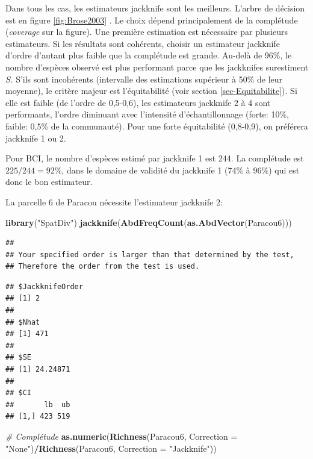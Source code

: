 \documentclass[
  11pt,
  french,
  a4paper,
  extrafontsizes,onecolumn,openright
  ]{memoir}
\newenvironment{Shaded}{\begin{snugshade}}{\end{snugshade}}
\newcommand{\CommentTok}[1]{\textcolor[rgb]{0.56,0.35,0.01}{\textit{#1}}}
\newcommand{\DataTypeTok}[1]{\textcolor[rgb]{0.13,0.29,0.53}{#1}}
\newcommand{\KeywordTok}[1]{\textcolor[rgb]{0.13,0.29,0.53}{\textbf{#1}}}
\newcommand{\NormalTok}[1]{#1}
\newcommand{\OperatorTok}[1]{\textcolor[rgb]{0.81,0.36,0.00}{\textbf{#1}}}
\newcommand{\StringTok}[1]{\textcolor[rgb]{0.31,0.60,0.02}{#1}}
\newlength{\rf}
\begin{document}
\normalsize

Dans tous les cas, les estimateurs jackknife sont les meilleurs.
L'arbre de décision est en figure \ref{fig:Brose2003} \autocite[fig.~6]{Brose2003}.
Le choix dépend principalement de la complétude (\emph{coverage} sur la figure).
Une première estimation est nécessaire par plusieurs estimateurs.
Si les résultats sont cohérents, choisir un estimateur jackknife d'ordre d'autant plus faible que la complétude est grande.
Au-delà de 96\%, le nombre d'espèces observé est plus performant parce que les jackknifes surestiment \(S\).
S'ils sont incohérents (intervalle des estimations supérieur à 50\% de leur moyenne), le critère majeur est l'équitabilité (voir section \ref{sec-Equitabilite}).
Si elle est faible (de l'ordre de 0,5-0,6), les estimateurs jackknife 2 à 4 sont performants, l'ordre diminuant avec l'intensité d'échantillonnage (forte: 10\%, faible: 0,5\% de la communauté).
Pour une forte équitabilité (0,8-0,9), on préférera jackknife 1 ou 2.

Pour BCI, le nombre d'espèces estimé par jackknife 1 est 244.
La complétude est \({225}/{244}=92\%\), dans le domaine de validité du jackknife 1 (74\% à 96\%) qui est donc le bon estimateur.

La parcelle 6 de Paracou nécessite l'estimateur jackknife 2:

\scriptsize

\begin{Shaded}
\begin{Highlighting}[]
\KeywordTok{library}\NormalTok{(}\StringTok{"SpatDiv"}\NormalTok{)}
\KeywordTok{jackknife}\NormalTok{(}\KeywordTok{AbdFreqCount}\NormalTok{(}\KeywordTok{as.AbdVector}\NormalTok{(Paracou6)))}
\end{Highlighting}
\end{Shaded}

\begin{verbatim}
## 
## Your specified order is larger than that determined by the test, 
## Therefore the order from the test is used.
\end{verbatim}

\begin{verbatim}
## $JackknifeOrder
## [1] 2
## 
## $Nhat
## [1] 471
## 
## $SE
## [1] 24.24871
## 
## $CI
##       lb  ub
## [1,] 423 519
\end{verbatim}

\begin{Shaded}
\begin{Highlighting}[]
\CommentTok{# Complétude}
\KeywordTok{as.numeric}\NormalTok{(}\KeywordTok{Richness}\NormalTok{(Paracou6, }\DataTypeTok{Correction =} \StringTok{"None"}\NormalTok{)}\OperatorTok{/}\KeywordTok{Richness}\NormalTok{(Paracou6,}
    \DataTypeTok{Correction =} \StringTok{"Jackknife"}\NormalTok{))}
\end{Highlighting}
\end{Shaded}
\end{document}
